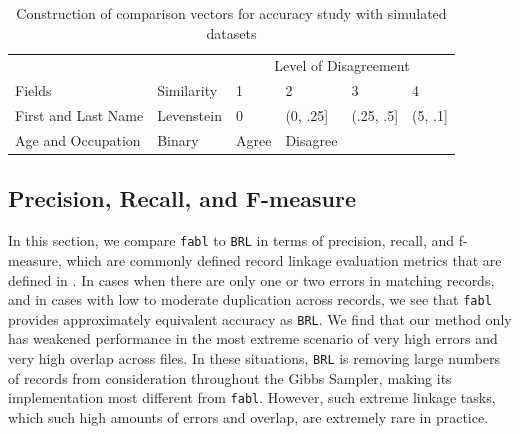 \documentclass[12pt,letterpaper]{article}
\newcommand{\1}[1]{\mathbb{I}\!\left[#1\right]} %
\begin{document}
\begin{table}[h!]
	\centering
	\begin{tabular}[t]{ll|llll}
		\hline
		\multicolumn{2}{c|}{ } & \multicolumn{4}{c}{Level of Disagreement} \\
		\cline{3-6}
		Fields & Similarity & 1 & 2 & 3 & 4\\
		\hline
		First and Last Name & Levenstein & 0 & (0, .25] & (.25, .5] & (5, .1]\\
		\hline
		Age and Occupation & Binary & Agree & Disagree &  & \\
		\hline
	\end{tabular}
\caption{Construction of comparison vectors for accuracy study with simulated datasets}
\label{Tab:sadinle_simulation_cutoffs}
\end{table}


\hypertarget{accuracy}{%
	\subsection{Precision, Recall, and F-measure}\label{accuracy}}
	
In this section, we compare \texttt{fabl} to 	\texttt{BRL} in terms of precision, recall, and f-measure, which are commonly defined record linkage evaluation metrics that are defined in \citep{christen_2012}. 
%
In cases when there are only one or two errors in matching records, and in cases with low to moderate duplication across records, we see that \texttt{fabl} provides approximately equivalent accuracy as \texttt{BRL}. 
We find that our method only has weakened performance in the
most extreme scenario of very high errors and very high overlap across
files. In these situations, \texttt{BRL} is removing large numbers of records from consideration throughout the Gibbs Sampler, making its implementation most different from \texttt{fabl}. However,  such extreme linkage tasks, which such high amounts of errors and overlap, are extremely rare in practice. 

%	
\end{document}
